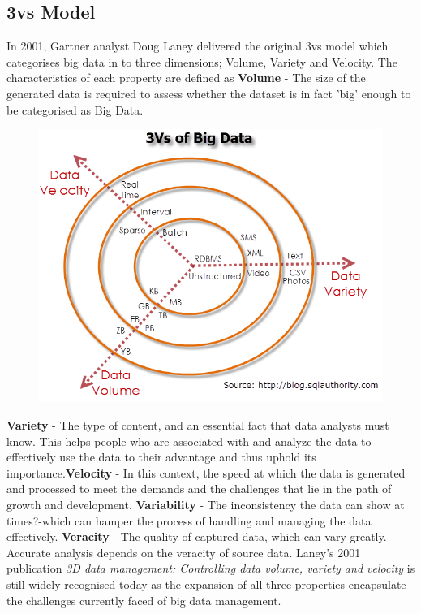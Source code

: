 \subsection{3vs Model}
In 2001, Gartner analyst Doug Laney delivered the original 3vs model which categorises big data in to three dimensions; Volume, Variety and Velocity.  The characteristics of each property are defined as \textbf{Volume} - The size of the generated data is required to assess whether the dataset is in fact 'big' enough to be categorised as Big Data. \begin{figure}\includegraphics[width = 1\linewidth]{images/3vs}\end{figure} \textbf{Variety} - The type of content, and an essential fact that data analysts must know. This helps people who are associated with and analyze the data to effectively use the data to their advantage and thus uphold its importance.\textbf{Velocity} - In this context, the speed at which the data is generated and processed to meet the demands and the challenges that lie in the path of growth and development. \textbf{Variability} - The inconsistency the data can show at times?-which can hamper the process of handling and managing the data effectively. \textbf{Veracity} - The quality of captured data, which can vary greatly. Accurate analysis depends on the veracity of source data. Laney's 2001 publication \textit{3D data management: Controlling data volume, variety and velocity} is still widely recognised today as the expansion of all three properties encapsulate the challenges currently faced of big data management.

